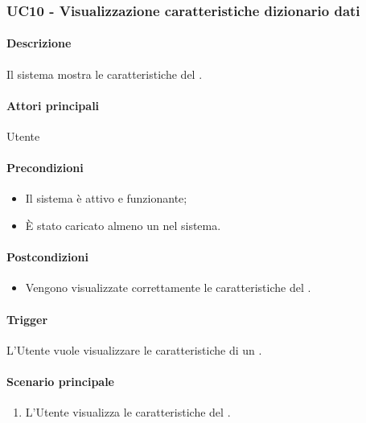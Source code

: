\subsubsection{UC10 - Visualizzazione caratteristiche dizionario dati}\label{UC10}
\paragraph*{Descrizione}
Il sistema mostra le caratteristiche del .

\paragraph*{Attori principali}
Utente

\paragraph*{Precondizioni}
\begin{itemize}
  \item Il sistema è attivo e funzionante;
  \item È stato caricato almeno un  nel sistema.  
\end{itemize}

\paragraph*{Postcondizioni}
\begin{itemize}
  \item Vengono visualizzate correttamente le caratteristiche del .
\end{itemize}

\paragraph*{Trigger}
L'Utente vuole visualizzare le caratteristiche di un .

\paragraph*{Scenario principale}
\begin{enumerate}
  \item L'Utente visualizza le caratteristiche del .
\end{enumerate}

